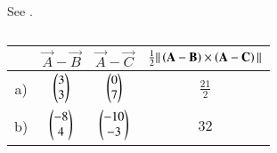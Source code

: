     See .
\begin{table}[H]
    \centering
    \caption{}
    \label{eq:10/7/3/1/area}
    \begin{tabular}{|c|c|c|c|}
        \hline
	     & $\vec{A}-\vec{B}$  & $\vec{A}-\vec{C}$  & $\frac{1}{2}\|\left(\mathbf{A}-\mathbf{B}\right) \times \left(\mathbf{A}-\mathbf{C}\right)\|$ \\
        \hline
         a)& $\begin{pmatrix} 3 \\3 \end{pmatrix}$ & $\begin{pmatrix} 0 \\ 7 \end{pmatrix}$ & $\frac{21}{2}$ \\
        \hline
	    b)& $\begin{pmatrix}
 -8 \\
 4 
 \end{pmatrix}$
         &$\begin{pmatrix}
 -10 \\
 -3 
 \end{pmatrix}$
  &  $32$   \\
        \hline
    \end{tabular}
\end{table}

